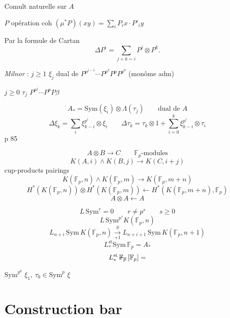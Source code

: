 \documentclass[11pt,a4paper]{article}
\begin{document}

Comult naturelle sur $A$

$P$ opération coh \quad $(\mu^{\ast}P)(xy) = \sum_i P_i x \cdot P'_i y$

Par la formule de Cartan
\[
  \Delta P^i = \sum_{j+k=i} P^j \otimes P^k .
\]

\emph{Milnor} : \quad $j \geq 1$ \quad $\xi_j$ \quad dual de $P^{p^{j-1}} \cdots P^{p^2}P^{p}P^{p^0}$ \quad (monôme adm)

$j \geq 0$ \quad $\tau_j$ \quad $P^{p^j} \cdots P^pP\beta$

\[
  A_{\ast} = \mathrm{Sym}(\xi_i) \otimes \Lambda(\tau_j)
  \qquad \text{dual de } A
\]
\[
  \Delta\xi_k = \sum_i \xi_{k-i}^{p^i}\otimes\xi_i
  \qquad
  \Delta\tau_k = \tau_k\otimes 1 + \sum_{i=0}^{k} \xi_{k-i}^{p^i}\otimes\tau_i
\]
p 85

\[
  A \otimes B \longrightarrow C \qquad \mathbb{F}_p\text{-modules}
\]
\[
  K(A,i) \wedge K(B,j) \longrightarrow K(C,i+j)
\]
cup-products pairings
\[
  K(\mathbb{F}_p,n)\wedge K(\mathbb{F}_p,m) \longrightarrow K(\mathbb{F}_p,m+n)
\]
\[
  H^{\ast}(K(\mathbb{F}_p,n))\otimes H^{\ast}(K(\mathbb{F}_p,m)) \longleftarrow
  H^{\ast}(K(\mathbb{F}_p,m+n),\mathbb{F}_p)
\]
\[
  A \otimes A \longleftarrow A
\]

\[
  L\,\mathrm{Sym}^r = 0 \qquad r \neq p^s \qquad s \geq 0
\]
\[
  L\,\mathrm{Sym}^{p^s}K(\mathbb{F}_p,n)
\]
\[
  L_{n+i}\,\mathrm{Sym}\,K(\mathbb{F}_p,n) \xrightarrow[+1]{S}
  L_{n+i+1}\,\mathrm{Sym}\,K(\mathbb{F}_p,n+1)
\]
\[
  L^{\mathrm{st}}_{\ast}\mathrm{Sym}\,\mathbb{F}_p = A_{\ast}
\]
\[
  L^{\mathrm{st}}_{\ast}\,\text{\struck{$\mathbb{F}_p$}}\,[\mathbb{F}_p] =
\]

\uncertain{$1 \in$} $\mathrm{Sym}^{p^0}$ \qquad $\xi_1,\ \tau_0 \in \mathrm{Sym}^p$ \qquad $\xi$

\section{Construction bar}
\end{document}
